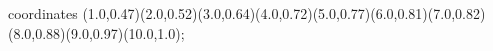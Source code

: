 					coordinates { (1.0,0.47)(2.0,0.52)(3.0,0.64)(4.0,0.72)(5.0,0.77)(6.0,0.81)(7.0,0.82)(8.0,0.88)(9.0,0.97)(10.0,1.0)};